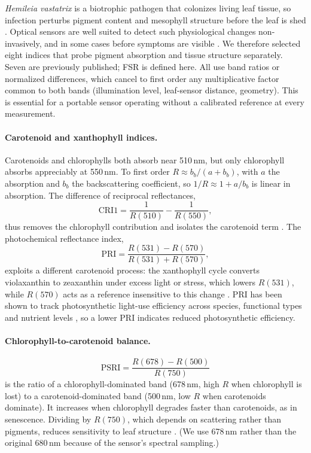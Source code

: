\documentclass[conference]{IEEEtran}
\begin{document}
\emph{Hemileia vastatrix} is a biotrophic pathogen that colonizes living leaf
tissue, so infection perturbs pigment content and mesophyll structure before
the leaf is shed \cite{talhinhas2017}. Optical sensors are well suited to
detect such physiological changes non-invasively, and in some cases before
symptoms are visible \cite{mahlein2012}. We therefore selected eight indices
that probe pigment absorption and tissue structure separately. Seven are
previously published; FSR is defined here. All use band ratios or normalized
differences, which cancel to first order any multiplicative factor common to
both bands (illumination level, leaf-sensor distance, geometry). This is
essential for a portable sensor operating without a calibrated reference
at every measurement.

\paragraph{Carotenoid and xanthophyll indices.}
Carotenoids and chlorophylls both absorb near 510\,nm, but only chlorophyll
absorbs appreciably at 550\,nm. To first order $R\approx b_b/(a+b_b)$, with $a$
the absorption and $b_b$ the backscattering coefficient, so $1/R\approx 1+a/b_b$
is linear in absorption. The difference of reciprocal reflectances,
\begin{equation}
\mathrm{CRI1}=\frac{1}{R(510)}-\frac{1}{R(550)},
\end{equation}
thus removes the chlorophyll contribution and isolates the carotenoid term
\cite{gitelson2002}.
The photochemical reflectance index,
\begin{equation}
\mathrm{PRI}=\frac{R(531)-R(570)}{R(531)+R(570)},
\end{equation}
exploits a different carotenoid process: the xanthophyll cycle converts
violaxanthin to zeaxanthin under excess light or stress, which lowers $R(531)$,
while $R(570)$ acts as a reference insensitive to this change \cite{gamon1992}.
PRI has been shown to track photosynthetic light-use efficiency across species,
functional types and nutrient levels \cite{gamon1997}, so a lower PRI indicates
reduced photosynthetic efficiency.

\paragraph{Chlorophyll-to-carotenoid balance.}
\begin{equation}
\mathrm{PSRI}=\frac{R(678)-R(500)}{R(750)}
\end{equation}
is the ratio of a chlorophyll-dominated band (678\,nm, high $R$ when
chlorophyll is lost) to a carotenoid-dominated band (500\,nm, low $R$ when
carotenoids dominate). It increases when chlorophyll degrades faster than
carotenoids, as in senescence. Dividing by $R(750)$, which depends on
scattering rather than pigments, reduces sensitivity to leaf structure
\cite{merzlyak1999}. (We use 678\,nm rather than the original 680\,nm because
of the sensor's spectral sampling.)
\end{document}
